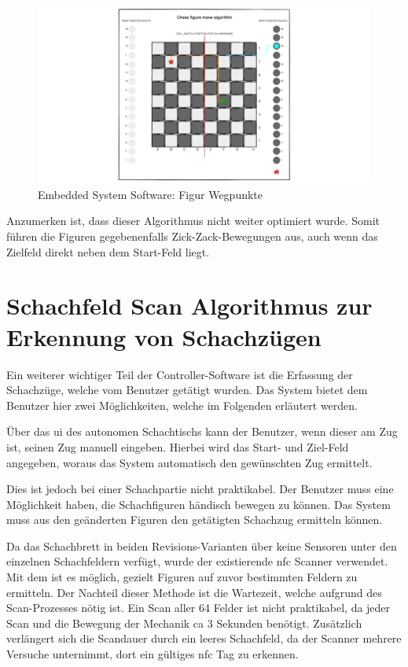 \begin{figure}
\centering
\includegraphics{images/ATC_FigureMoveAlgorithm.png}
\caption{Embedded System Software: Figur Wegpunkte
\label{ATC_FigureMoveAlgorithm}}
\end{figure}

Anzumerken ist, dass dieser Algorithmus nicht weiter optimiert wurde.
Somit führen die Figuren gegebenenfalls Zick-Zack-Bewegungen aus, auch
wenn das Zielfeld direkt neben dem Start-Feld liegt.

\hypertarget{schachfeld-scan-algorithmus-zur-erkennung-von-schachzuxfcgen}{%
\section{Schachfeld Scan Algorithmus zur Erkennung von
Schachzügen}\label{schachfeld-scan-algorithmus-zur-erkennung-von-schachzuxfcgen}}

Ein weiterer wichtiger Teil der Controller-Software ist die Erfassung
der Schachzüge, welche vom Benutzer getätigt wurden. Das System bietet
dem Benutzer hier zwei Möglichkeiten, welche im Folgenden erläutert
werden.

Über das \gls{ui} des autonomen Schachtischs kann der Benutzer, wenn
dieser am Zug ist, seinen Zug manuell eingeben. Hierbei wird das Start-
und Ziel-Feld angegeben, woraus das System automatisch den gewünschten
Zug ermittelt.

Dies ist jedoch bei einer Schachpartie nicht praktikabel. Der Benutzer
muss eine Möglichkeit haben, die Schachfiguren händisch bewegen zu
können. Das System muss aus den geänderten Figuren den getätigten
Schachzug ermitteln können.

Da das Schachbrett in beiden Revisions-Varianten über keine Sensoren
unter den einzelnen Schachfeldern verfügt, wurde der existierende
\gls{nfc} Scanner verwendet. Mit dem ist es möglich, gezielt Figuren auf
zuvor bestimmten Feldern zu ermitteln. Der Nachteil dieser Methode ist
die Wartezeit, welche aufgrund des Scan-Prozesses nötig ist. Ein Scan
aller 64 Felder ist nicht praktikabel, da jeder Scan und die Bewegung
der Mechanik ca 3 Sekunden benötigt. Zusätzlich verlängert sich die
Scandauer durch ein leeres Schachfeld, da der Scanner mehrere Versuche
unternimmt, dort ein gültiges \gls{nfc} Tag zu erkennen.

